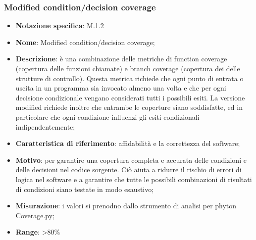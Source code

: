 \subsubsection{Modified condition/decision coverage}
\begin{itemize}
    \item \textbf{Notazione specifica}: M.1.2
    \item \textbf{Nome}: Modified condition/decision coverage;
    \item \textbf{Descrizione}: è una combinazione delle metriche di function coverage (copertura delle funzioni chiamate) e branch coverage (copertura dei  delle strutture di controllo). Questa metrica richiede che ogni punto di entrata o uscita in un programma sia invocato almeno una volta e che per ogni decisione condizionale vengano considerati tutti i possibili esiti. La versione modified richiede inoltre che entrambe le coperture siano soddisfatte, ed in particolare che ogni condizione influenzi gli esiti condizionali indipendentemente;
    \item \textbf{Caratteristica di riferimento}: affidabilità e la correttezza del software;
    \item \textbf{Motivo}: per garantire una copertura completa e accurata delle condizioni e delle decisioni nel codice sorgente. Ciò aiuta a ridurre il rischio di errori di logica nel software e a garantire che tutte le possibili combinazioni di risultati di condizioni siano testate in modo esaustivo;
    \item \textbf{Misurazione}: i valori si prenodno dallo strumento di analisi per phyton Coverage.py;
    \item \textbf{Range}: >80\%
\end{itemize}


